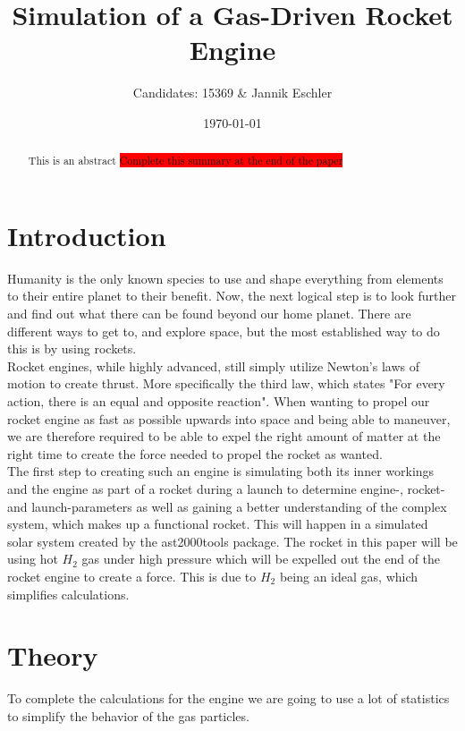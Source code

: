 \documentclass[reprint,english,notitlepage]{revtex4-2}
\begin{document}
\title{Simulation of a Gas-Driven Rocket Engine}
\author{Candidates: 15369 \& Jannik Eschler}
\date{\today}

\begin{abstract}
This is an abstract \colorbox{red}{Complete this summary at the end of the paper}
\end{abstract}
\maketitle

\section{Introduction}
Humanity is the only known species to use and shape everything from elements to their entire planet to their benefit.
Now, the next logical step is to look further and find out what there can be found beyond our home planet.
There are different ways to get to, and explore space, but the most established way to do this is by using rockets.\\
Rocket engines, while highly advanced, still simply utilize Newton's laws of motion to create thrust.
More specifically the third law, which states "For every action, there is an equal and opposite reaction".
When wanting to propel our rocket engine as fast as possible upwards into space and being able to maneuver, we are therefore required
to be able to expel the right amount of matter at the right time to create the force needed to propel the rocket as wanted.\\
The first step to creating such an engine is simulating both its inner workings and the engine as part of a rocket during a launch to determine engine-, rocket- and launch-parameters
as well as gaining a better understanding of the complex system, which makes up a functional rocket. This will happen in a simulated solar system created by the ast2000tools package.
The rocket in this paper will be using hot $ H_2 $ gas under high pressure which will be expelled out the end of the rocket engine to create a force.
This is due to $H_2$ being an ideal gas, which simplifies calculations.

\section{Theory}
To complete the calculations for the engine we are going to use a lot of statistics to simplify the behavior of the gas particles. 
\end{document}
